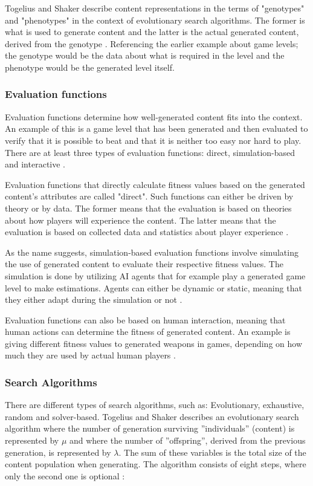 Togelius and Shaker describe content representations in the terms of "genotypes" and "phenotypes" in the context of evolutionary search algorithms. The former is what is used to generate content and the latter is the actual generated content, derived from the genotype \cite[pp. 18, 20]{shaker2016procedural}. Referencing the earlier example about game levels; the genotype would be the data about what is required in the level and the phenotype would be the generated level itself.

\subsubsection{Evaluation functions}
Evaluation functions determine how well-generated content fits into the context. An example of this is a game level that has been generated and then evaluated to verify that it is possible to beat and that it is neither too easy nor hard to play. There are at least three types of evaluation functions: direct, simulation-based and interactive \cite[pp. 18-24]{shaker2016procedural}.

Evaluation functions that directly calculate fitness values based on the generated content's attributes are called "direct". Such functions can either be driven by theory or by data. The former means that the evaluation is based on theories about how players will experience the content. The latter means that the evaluation is based on collected data and statistics about player experience \cite[p. 23]{shaker2016procedural}.

As the name suggests, simulation-based evaluation functions involve simulating the use of generated content to evaluate their respective fitness values. The simulation is done by utilizing AI agents that for example play a generated game level to make estimations. Agents can either be dynamic or static, meaning that they either adapt during the simulation or not \cite[pp. 23-24]{shaker2016procedural}.

Evaluation functions can also be based on human interaction, meaning that human actions can determine the fitness of generated content. An example is giving different fitness values to generated weapons in games, depending on how much they are used by actual human players \cite[p. 24]{shaker2016procedural}.

\subsubsection{Search Algorithms}
There are different types of search algorithms, such as: Evolutionary, exhaustive, random and solver-based. Togelius and Shaker describes an evolutionary search algorithm where the number of generation surviving ''individuals'' (content) is represented by $\mu$ and where the number of ''offspring'', derived from the previous generation, is represented by $\lambda$. The sum of these variables is the total size of the content population when generating. The algorithm consists of eight steps, where only the second one is optional \cite[p. 18-20]{shaker2016procedural}:

